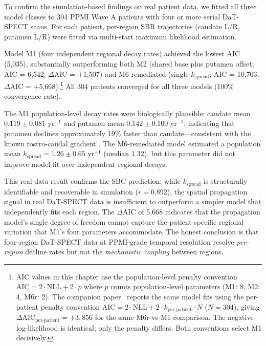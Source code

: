 To confirm the simulation-based findings on real patient data, we fitted all three model classes to 304 PPMI Wave A patients with four or more serial DaT-SPECT scans. For each patient, per-region SBR trajectories (caudate L/R, putamen L/R) were fitted via multi-start maximum likelihood estimation.

Model M1 (four independent regional decay rates) achieved the lowest AIC (5,035), substantially outperforming both M2 (shared base plus putamen offset; AIC = 6,542; $\Delta$AIC = +1,507) and M6-remediated (single $k_{\text{spread}}$; AIC = 10,703; $\Delta$AIC = +5,668).\footnote{AIC values in this chapter use the population-level penalty convention $\text{AIC} = 2 \cdot \text{NLL} + 2 \cdot p$ where $p$ counts population-level parameters (M1: 8, M2: 4, M6r: 2). The companion paper~\cite{dupre2026paper8b} reports the same model fits using the per-patient penalty convention $\text{AIC} = 2 \cdot \text{NLL} + 2 \cdot k_{\text{per-patient}} \cdot N$ ($N=304$), giving $\Delta$AIC$_{\text{per-patient}} = +3{,}856$ for the same M6r-vs-M1 comparison. The negative log-likelihood is identical; only the penalty differs. Both conventions select M1 decisively.} All 304 patients converged for all three models (100\% convergence rate).

The M1 population-level decay rates were biologically plausible: caudate mean $0.119 \pm 0.081$ yr$^{-1}$ and putamen mean $0.142 \pm 0.100$ yr$^{-1}$, indicating that putamen declines approximately 19\% faster than caudate---consistent with the known rostro-caudal gradient \cite{kish1988, brooks1990}. The M6-remediated model estimated a population mean $k_{\text{spread}} = 1.26 \pm 0.65$ yr$^{-1}$ (median 1.32), but this parameter did not improve model fit over independent regional decays.

This real-data result confirms the SBC prediction: while $k_{\text{spread}}$ is structurally identifiable and recoverable in simulation ($r = 0.892$), the spatial propagation signal in real DaT-SPECT data is insufficient to outperform a simpler model that independently fits each region. The $\Delta$AIC of 5,668 indicates that the propagation model's single degree of freedom cannot capture the patient-specific regional variation that M1's four parameters accommodate. The honest conclusion is that four-region DaT-SPECT data at PPMI-grade temporal resolution resolve \textit{per-region} decline rates but not the \textit{mechanistic coupling} between regions.

